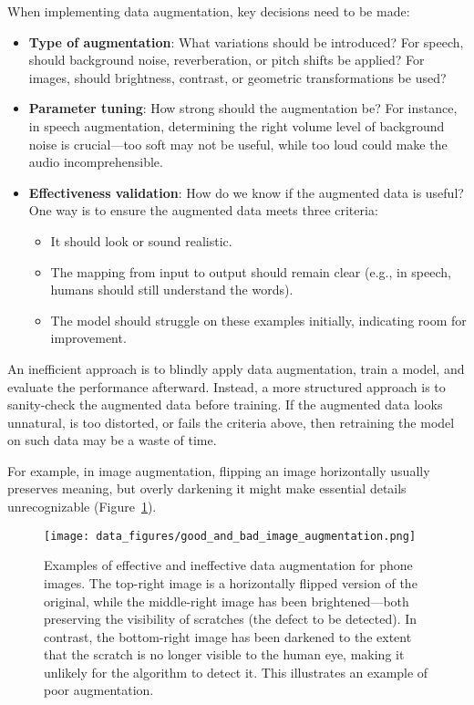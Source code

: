 \documentclass[12pt,openany, draft]{book}
\begin{document}
When implementing data augmentation, key decisions need to be made:
\begin{itemize}
    \item \textbf{Type of augmentation}: What variations should be introduced? For speech, should background noise, reverberation, or pitch shifts be applied? For images, should brightness, contrast, or geometric transformations be used?
    \item \textbf{Parameter tuning}: How strong should the augmentation be? For instance, in speech augmentation, determining the right volume level of background noise is crucial—too soft may not be useful, while too loud could make the audio incomprehensible.
    \item \textbf{Effectiveness validation}: How do we know if the augmented data is useful? One way is to ensure the augmented data meets three criteria:
        \begin{itemize}
            \item It should look or sound realistic.
            \item The mapping from input to output should remain clear (e.g., in speech, humans should still understand the words).
            \item The model should struggle on these examples initially, indicating room for improvement.
        \end{itemize}
\end{itemize}

An inefficient approach is to blindly apply data augmentation, train a model, and evaluate the performance afterward. Instead, a more structured approach is to sanity-check the augmented data before training. If the augmented data looks unnatural, is too distorted, or fails the criteria above, then retraining the model on such data may be a waste of time. \newline

For example, in image augmentation, flipping an image horizontally usually preserves meaning, but overly darkening it might make essential details unrecognizable (Figure~\ref{fig:good_and_bad_image_augmentation}). 

\begin{figure}[H]
    \centering
    \texttt{[image: data\_figures/good\_and\_bad\_image\_augmentation.png]}
    \caption{Examples of effective and ineffective data augmentation for phone images. The top-right image is a horizontally flipped version of the original, while the middle-right image has been brightened—both preserving the visibility of scratches (the defect to be detected). In contrast, the bottom-right image has been darkened to the extent that the scratch is no longer visible to the human eye, making it unlikely for the algorithm to detect it. This illustrates an example of poor augmentation.}
    \label{fig:good_and_bad_image_augmentation}
\end{figure}
\end{document}
